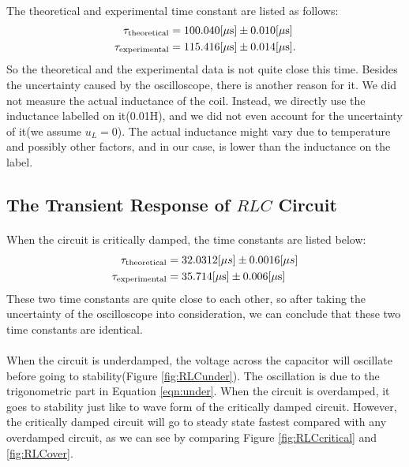 \documentclass{my_template}
\begin{document}
    \paragraph{}The theoretical and experimental time constant are listed as follows:
    \begin{eqnarray*}
        \tau_{\rm theoretical}&=100.040[\mu \rm s]\pm 0.010[\mu s]\\
        \tau_{\rm experimental}&=115.416[\mu \rm s]\pm 0.014[\mu s].\\
    \end{eqnarray*}
    So the theoretical and the experimental data is not quite close this time. Besides the uncertainty caused by the oscilloscope, there is another reason for it. We did not measure the actual inductance of the coil. Instead, we directly use the inductance labelled on it(0.01H), and we did not even account for the uncertainty of it(we assume $u_L=0$). The actual inductance might vary due to temperature and possibly other factors, and in our case, is lower than the inductance on the label.
    \subsection{The Transient Response of $RLC$ Circuit}
    \paragraph{} When the circuit is critically damped, the time constants are listed below:
    \begin{eqnarray*}
        \tau_{\rm theoretical}&=32.0312[\mu s]\pm 0.0016[\mu s]\\
        \tau_{\rm experimental}&=35.714[\rm\mu s]\pm 0.006[\mu s]\\
    \end{eqnarray*}
    These two time constants are quite close to each other, so after taking the uncertainty of the oscilloscope into consideration, we can conclude that these two time constants are identical. 
    \vspace{-5mm}
    \paragraph{} When the circuit is underdamped, the voltage across the capacitor will oscillate before going to stability(Figure \ref{fig:RLCunder}). The oscillation is due to the trigonometric part in Equation \ref{eqn:under}. When the circuit is overdamped, it goes to stability just like to wave form of the critically damped circuit. However, the critically damped circuit will go to steady state fastest compared with any overdamped circuit, as we can see by comparing Figure \ref{fig:RLCcritical} and \ref{fig:RLCover}.
\end{document}
